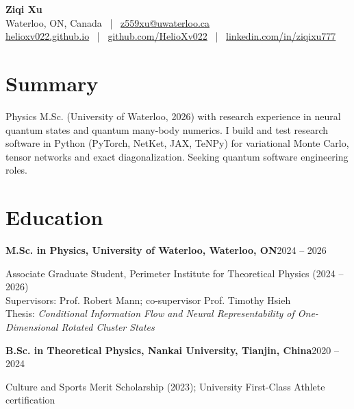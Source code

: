 \documentclass[11pt,letterpaper]{article}
\newcommand{\entry}[2]{\par\noindent\textbf{#1}\hfill #2\par}
\begin{document}
{\LARGE\bfseries Ziqi Xu}\\[3pt]
Waterloo, ON, Canada \ | \ \href{mailto:z559xu@uwaterloo.ca}{z559xu@uwaterloo.ca}\\
\href{https://helioxv022.github.io}{helioxv022.github.io} \ | \ \href{https://github.com/HelioXv022}{github.com/HelioXv022} \ | \ \href{https://www.linkedin.com/in/ziqixu777}{linkedin.com/in/ziqixu777}

\section{Summary}
Physics M.Sc. (University of Waterloo, 2026) with research experience in neural quantum states and
quantum many-body numerics. I build and test research software in Python (PyTorch, NetKet, JAX, TeNPy)
for variational Monte Carlo, tensor networks and exact diagonalization. Seeking quantum software
engineering roles.

\section{Education}
\entry{M.Sc. in Physics, University of Waterloo, Waterloo, ON}{2024 -- 2026}
Associate Graduate Student, Perimeter Institute for Theoretical Physics (2024 -- 2026)\\
Supervisors: Prof. Robert Mann; co-supervisor Prof. Timothy Hsieh\\
Thesis: \textit{Conditional Information Flow and Neural Representability of One-Dimensional Rotated Cluster States}

\vspace{5pt}
\entry{B.Sc. in Theoretical Physics, Nankai University, Tianjin, China}{2020 -- 2024}
Culture and Sports Merit Scholarship (2023); University First-Class Athlete certification
\end{document}
